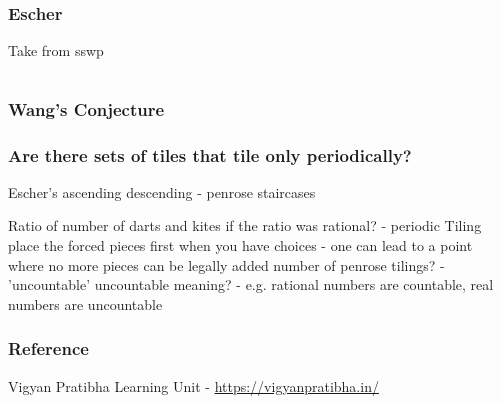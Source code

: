 \documentclass{beamer}
\begin{document}
\begin{frame}
\begin{columns}
\begin{column}{0.6\textwidth}
        \end{column}
    \end{columns}    
\end{frame}

\begin{frame}
\end{frame}
\begin{frame}    
    \frametitle{Escher}
    Take from sswp
    \begin{columns}
        \begin{column}{0.45\textwidth}    
        \end{column}
        \begin{column}{0.45\textwidth}    
        \end{column}
    \end{columns}
\end{frame}
\begin{frame}
\frametitle{Wang's Conjecture}
\end{frame}
\begin{frame}
    \frametitle{Are there sets of tiles that tile only periodically?}
\end{frame}
\begin{frame}
Escher's ascending descending - penrose staircases
\end{frame}
\begin{frame}
Ratio of number of darts and kites
if the ratio was rational? - periodic Tiling
place the forced pieces first
when you have choices - one can lead to a point where no more pieces can be legally added
number of penrose tilings? - 'uncountable'
uncountable meaning? - e.g. rational numbers are countable, real numbers are uncountable

\end{frame}

\begin{frame}
\frametitle{Reference}
Vigyan Pratibha Learning Unit - \url{https://vigyanpratibha.in/}
\end{frame}
\end{document}
